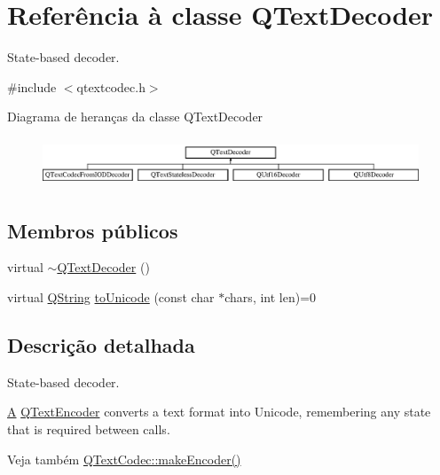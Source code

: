 \hypertarget{class_q_text_decoder}{\section{Referência à classe Q\-Text\-Decoder}
\label{class_q_text_decoder}
}


State-\/based decoder.  




{\ttfamily \#include $<$qtextcodec.\-h$>$}

Diagrama de heranças da classe Q\-Text\-Decoder\begin{figure}[H]
\begin{center}
\leavevmode
\includegraphics[height=1.473684cm]{class_q_text_decoder}
\end{center}
\end{figure}
\subsection*{Membros públicos}
\begin{DoxyCompactItemize}
\item 
virtual \hyperlink{class_q_text_decoder_aa083432764ae5af7a706e30aaa2eba28}{$\sim$\-Q\-Text\-Decoder} ()
\item 
virtual \hyperlink{class_q_string}{Q\-String} \hyperlink{class_q_text_decoder_a69f80ea56957b935500789ca12a5695b}{to\-Unicode} (const char $\ast$chars, int len)=0
\end{DoxyCompactItemize}


\subsection{Descrição detalhada}
State-\/based decoder. 

\hyperlink{class_a}{A} \hyperlink{class_q_text_encoder}{Q\-Text\-Encoder} converts a text format into Unicode, remembering any state that is required between calls.

\begin{DoxySeeAlso}{Veja também}
\hyperlink{class_q_text_codec_af324249beeb8b0b38aa7b32ba7c8c09f}{Q\-Text\-Codec\-::make\-Encoder()} 
\end{DoxySeeAlso}


